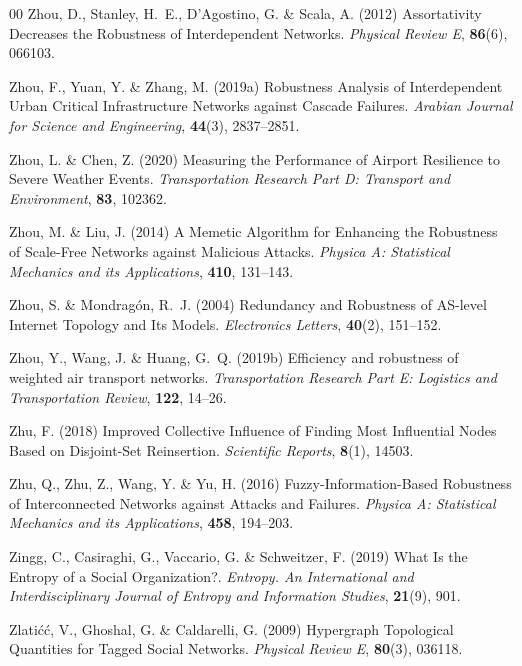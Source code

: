 \documentclass{comnet-mod}
\begin{document}
\begin{thebibliography}{00}
Zhou, D., Stanley, H.~E., D'Agostino, G. {\&} Scala, A. (2012)  {Assortativity
  Decreases the Robustness of Interdependent Networks}. {\em {Physical Review
  E}}, \textbf{86}(6), 066103.

Zhou, F., Yuan, Y. {\&} Zhang, M. (2019a)  {Robustness Analysis of
  Interdependent Urban Critical Infrastructure Networks against Cascade
  Failures}. {\em {Arabian Journal for Science and Engineering}},
  \textbf{44}(3), 2837--2851.

Zhou, L. {\&} Chen, Z. (2020)  {Measuring the Performance of Airport Resilience
  to Severe Weather Events}. {\em {Transportation Research Part D: Transport
  and Environment}}, \textbf{83}, 102362.

Zhou, M. {\&} Liu, J. (2014)  {A Memetic Algorithm for Enhancing the Robustness
  of Scale-Free Networks against Malicious Attacks}. {\em {Physica A:
  Statistical Mechanics and its Applications}}, \textbf{410}, 131--143.

Zhou, S. {\&} Mondrag{\'o}n, R.~J. (2004)  {Redundancy and Robustness of
  {{AS-level Internet}} Topology and Its Models}. {\em {Electronics Letters}},
  \textbf{40}(2), 151--152.

Zhou, Y., Wang, J. {\&} Huang, G.~Q. (2019b)  Efficiency and robustness of
  weighted air transport networks. {\em {Transportation Research Part E:
  Logistics and Transportation Review}}, \textbf{122}, 14--26.

Zhu, F. (2018)  {Improved Collective Influence of Finding Most Influential
  Nodes Based on Disjoint-Set Reinsertion}. {\em {Scientific Reports}},
  \textbf{8}(1), 14503.

Zhu, Q., Zhu, Z., Wang, Y. {\&} Yu, H. (2016)  {Fuzzy-Information-Based
  Robustness of Interconnected Networks against Attacks and Failures}. {\em
  {Physica A: Statistical Mechanics and its Applications}}, \textbf{458},
  194--203.

Zingg, C., Casiraghi, G., Vaccario, G. {\&} Schweitzer, F. (2019)  {What Is the
  Entropy of a Social Organization?}. {\em {Entropy. An International and
  Interdisciplinary Journal of Entropy and Information Studies}},
  \textbf{21}(9), 901.

Zlati{\'c}{\'c}, V., Ghoshal, G. {\&} Caldarelli, G. (2009)  {Hypergraph
  Topological Quantities for Tagged Social Networks}. {\em {Physical Review
  E}}, \textbf{80}(3), 036118.

\end{thebibliography}




\end{document}
